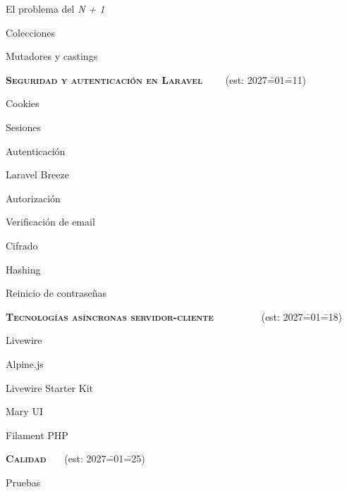 \begin{longenum}
\begin{longenum}
\begin{longenum}
\begin{longenum}
                \begin{longenum}
                    \item El problema del \textit{N + 1}
                \end{longenum}
            \end{longenum}
            \item Colecciones
            \item Mutadores y castings
        \end{longenum}
    \end{longenum}
    \item \textbf{\textsc{Seguridad y autenticación en Laravel}} \ \ \ \ (est: 2027\==01\==11)
    \begin{longenum}
        \item Cookies
        \item Sesiones
        \item Autenticación
        \begin{longenum}
            \item Laravel Breeze
        \end{longenum}
        \item Autorización
        \item Verificación de email
        \item Cifrado
        \item Hashing
        \item Reinicio de contraseñas
    \end{longenum}
    \item \textbf{\textsc{Tecnologías asíncronas servidor-cliente}} \ \ \ \ \ \ \ \ \ (est: 2027\==01\==18)
    \begin{longenum}
        \item Livewire
        \begin{longenum}
            \item Alpine.js
            \item Livewire Starter Kit
            \item Mary UI
        \end{longenum}
        \item Filament PHP
    \end{longenum}
    \item \textbf{\textsc{Calidad}} \ \ \ (est: 2027\==01\==25)
    \begin{longenum}
        \item Pruebas

\end{longenum}
\end{longenum}
